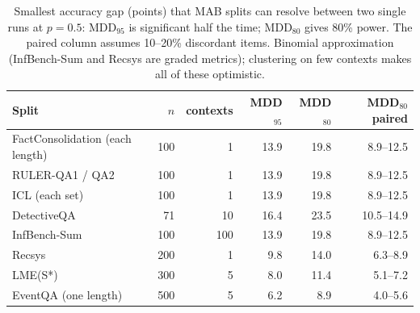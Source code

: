 \begin{table}[t]\centering\footnotesize
\begin{tabular}{@{}lrrrrr@{}}\toprule
Split & $n$ & contexts & MDD$_{95}$ & MDD$_{80}$ & MDD$_{80}$ paired \\\midrule
FactConsolidation (each length) & 100 & 1 & 13.9 & 19.8 & 8.9--12.5 \\
RULER-QA1 / QA2 & 100 & 1 & 13.9 & 19.8 & 8.9--12.5 \\
ICL (each set) & 100 & 1 & 13.9 & 19.8 & 8.9--12.5 \\
DetectiveQA & 71 & 10 & 16.4 & 23.5 & 10.5--14.9 \\
InfBench-Sum & 100 & 100 & 13.9 & 19.8 & 8.9--12.5 \\
Recsys & 200 & 1 & 9.8 & 14.0 & 6.3--8.9 \\
LME(S*) & 300 & 5 & 8.0 & 11.4 & 5.1--7.2 \\
EventQA (one length) & 500 & 5 & 6.2 & 8.9 & 4.0--5.6 \\
\bottomrule\end{tabular}
\caption{Smallest accuracy gap (points) that MAB splits can resolve between two single runs at $p=0.5$: MDD$_{95}$ is significant half the time; MDD$_{80}$ gives 80\% power. The paired column assumes 10--20\% discordant items. Binomial approximation (InfBench-Sum and Recsys are graded metrics); clustering on few contexts makes all of these optimistic.}
\label{tab:mdd}
\end{table}
